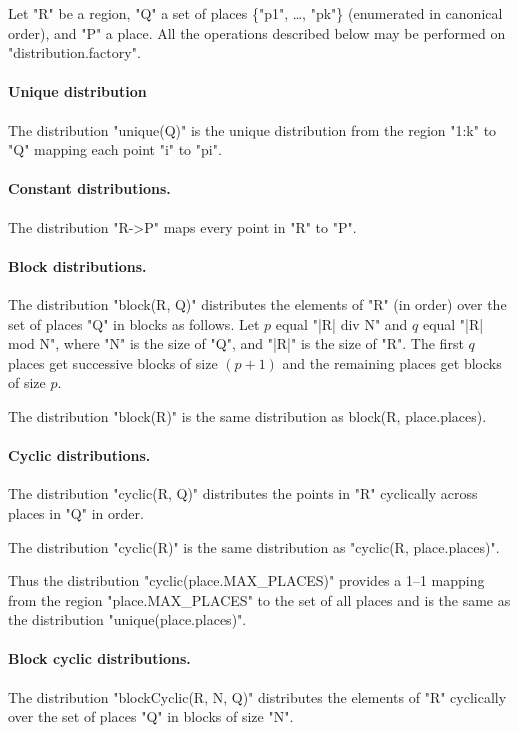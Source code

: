 Let \xcd"R" be a region, \xcd"Q" a set of places \{\xcd"p1", \dots, \xcd"pk"\}
(enumerated in canonical order), and \xcd"P" a place. All the operations
described below may be performed on \xcd"distribution.factory".

\paragraph{Unique distribution} 
The distribution \xcd"unique(Q)" is the unique distribution from the
region \xcd"1:k" to \xcd"Q" mapping each point \xcd"i" to \xcd"pi".

\paragraph{Constant distributions.} 
The distribution \xcd"R->P" maps every point in \xcd"R" to \xcd"P".

\paragraph{Block distributions.}
The distribution \xcd"block(R, Q)" distributes the elements of \xcd"R"
(in order) over the set of places \xcd"Q" in blocks  as
follows. Let $p$ equal \xcd"|R| div N" and $q$ equal \xcd"|R| mod N",
where \xcd"N" is the size of \xcd"Q", and 
\xcd"|R|" is the size of \xcd"R".  The first $q$ places get
successive blocks of size $(p+1)$ and the remaining places get blocks of
size $p$.

The distribution \xcd"block(R)" is the same distribution as {\cf
block(R, place.places)}.

\paragraph{Cyclic distributions.} 
The distribution \xcd"cyclic(R, Q)" distributes the points in \xcd"R"
cyclically across places in \xcd"Q" in order.

The distribution \xcd"cyclic(R)" is the same distribution as \xcd"cyclic(R, place.places)".

Thus the distribution \xcd"cyclic(place.MAX_PLACES)" provides a 1--1
mapping from the region \xcd"place.MAX_PLACES" to the set of all
places and is the same as the distribution \xcd"unique(place.places)".

\paragraph{Block cyclic distributions.}
The distribution \xcd"blockCyclic(R, N, Q)" distributes the elements
of \xcd"R" cyclically over the set of places \xcd"Q" in blocks of size
\xcd"N".


